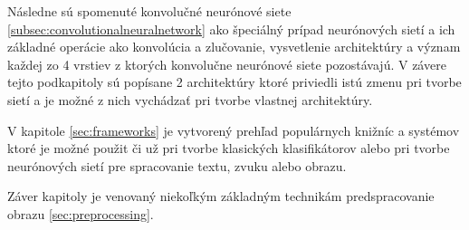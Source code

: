 Následne sú spomenuté konvolučné neurónové siete \ref{subsec:convolutionalneuralnetwork} ako špeciálný prípad neurónových sietí a ich základné operácie ako konvolúcia a zlučovanie,
    vysvetlenie architektúry a význam každej zo 4 vrstiev z ktorých konvolučne neurónové siete pozostávajú.
V závere tejto podkapitoly sú popísane 2 architektúry ktoré priviedli istú zmenu pri tvorbe sietí a je možné z nich vychádzať pri tvorbe vlastnej architektúry.

V kapitole \ref{sec:frameworks} je vytvorený prehľad populárnych knižníc a systémov ktoré je možné použit či už pri tvorbe klasických klasifikátorov alebo
    pri tvorbe neurónových sietí pre spracovanie textu, zvuku alebo obrazu.

Záver kapitoly je venovaný niekoľkým základným technikám predspracovanie obrazu \ref{sec:preprocessing}.
